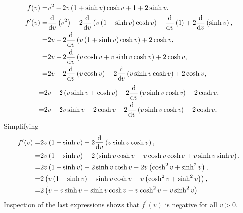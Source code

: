 \begin{align*}
	f(v) =& v^2 - 2v\left(1+\sinh v\right)\cosh v + 1 + 2\sinh v,\\
	f^\prime(v) =& \frac{\mathrm{d}}{\mathrm{d}v}\left(v^2\right) -2\frac{\mathrm{d}}{\mathrm{d}v}\left(v\left(1+\sinh v\right)\cosh v\right) +\frac{\mathrm{d}}{\mathrm{d}v}\left(1\right) + 2\frac{\mathrm{d}}{\mathrm{d}v}\left(\sinh v\right),\\
	=& 2v -2\frac{\mathrm{d}}{\mathrm{d}v}\left(v\left(1+\sinh v\right)\cosh v\right) + 2\cosh v,\\
	=& 2v -2\frac{\mathrm{d}}{\mathrm{d}v}\left(v\cosh v + v\sinh v\cosh v\right) + 2\cosh v,\\
	=& 2v -2\frac{\mathrm{d}}{\mathrm{d}v}\left(v\cosh v\right) - 2\frac{\mathrm{d}}{\mathrm{d}v}\left(v\sinh v\cosh v\right) + 2\cosh v,
\end{align*}
\begin{align*}
	=& 2v -2\left(v\sinh v + \cosh v\right) - 2\frac{\mathrm{d}}{\mathrm{d}v}\left(v\sinh v\cosh v\right) + 2\cosh v,\\
	=& 2v -2v\sinh v -2 \cosh v - 2\frac{\mathrm{d}}{\mathrm{d}v}\left(v\sinh v\cosh v\right) + 2\cosh v,
\end{align*}
Simplifying
\begin{align*}
	f^\prime(v)=&2v\left(1 -\sinh v\right) - 2\frac{\mathrm{d}}{\mathrm{d}v}\left(v\sinh v\cosh v\right),\\
	=& 2v\left(1 -\sinh v\right)-2\left(\sinh v\cosh v+v\cosh v\cosh v + v \sinh v \sinh v\right),\\
	=& 2v\left(1 -\sinh v\right)-2\sinh v\cosh v-2v\left(\cosh^2 v + \sinh^2 v\right),\\
	=& 2\left(v\left(1 -\sinh v\right)-\sinh v\cosh v-v\left(\cosh^2 v + \sinh^2 v\right)\right),\\
	=& 2\left(v - v\sinh v-\sinh v\cosh v-v\cosh^2 v -v\sinh^2 v\right)
\end{align*}
Inspection of the last expressions shows that $f^\prime(v)$ is negative for all $v>0$.



